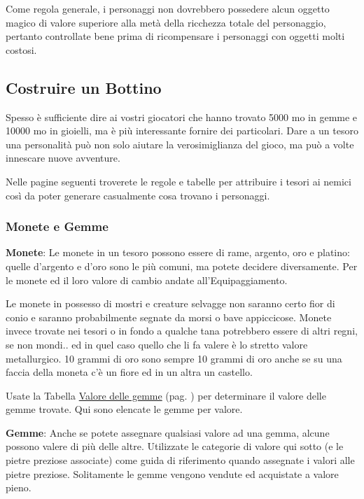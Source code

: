 \begin{multicols}{2}
Come regola generale, i personaggi non dovrebbero possedere alcun oggetto magico di valore superiore alla metà della ricchezza totale del personaggio, pertanto controllate bene prima di ricompensare i personaggi con oggetti molti costosi.

\subsection{Costruire un Bottino}\label{costruireunbottino}

Spesso è sufficiente dire ai vostri giocatori che hanno trovato 5000 mo in gemme e 10000 mo in gioielli, ma è più interessante fornire dei particolari. Dare a un tesoro una personalità può non solo aiutare la verosimiglianza del gioco, ma può a volte innescare nuove avventure.

Nelle pagine seguenti troverete le regole e tabelle per attribuire i tesori ai nemici così da poter generare casualmente cosa trovano i personaggi.

\subsubsection{Monete e Gemme}\label{gemme}

\textbf{Monete}: Le monete in un tesoro possono essere di rame, argento, oro e platino: quelle d'argento e d'oro sono le più comuni, ma potete decidere diversamente. Per le monete ed il loro valore di cambio andate all'Equipaggiamento.

Le monete in possesso di mostri e creature selvagge non saranno certo fior di conio e saranno probabilmente segnate da morsi o bave appiccicose. Monete invece trovate nei tesori o in fondo a qualche tana potrebbero essere di altri regni, se non mondi.. ed in quel caso quello che li fa valere è lo stretto valore metallurgico. 10 grammi di oro sono sempre 10 grammi di oro anche se su una faccia della moneta c'è un fiore ed in un altra un castello.

Usate la Tabella \hyperlink{valoredellegemme}{Valore delle gemme} (pag. \pageref{valoredellegemme}) per determinare il valore delle gemme trovate. Qui sono elencate le gemme per valore.

\textbf{Gemme}: Anche se potete assegnare qualsiasi valore ad una gemma, alcune possono valere di più delle altre. Utilizzate le categorie di valore qui sotto (e le pietre preziose associate) come guida di riferimento quando assegnate i valori alle pietre preziose. Solitamente le gemme vengono vendute ed acquistate a valore pieno.


\end{multicols}
